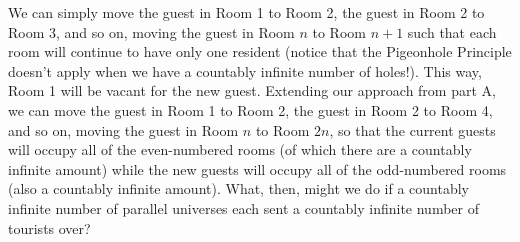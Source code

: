 \documentclass[solution, letterpaper]{cs20inclass}
\begin{document}
\begin{solution}
\subsolution We can simply move the guest in Room 1 to Room 2, the guest in Room 2 to Room 3, and so on, moving the guest in Room $n$ to Room $n+1$ such that each room will continue to have only one resident (notice that the Pigeonhole Principle doesn't apply when we have a countably infinite number of holes!). This way, Room 1 will be vacant for the new guest.
\subsolution Extending our approach from part A, we can move the guest in Room 1 to Room 2, the guest in Room 2 to Room 4, and so on, moving the guest in Room $n$ to Room $2n$, so that the current guests will occupy all of the even-numbered rooms (of which there are a countably infinite amount) while the new guests will occupy all of the odd-numbered rooms (also a countably infinite amount). What, then, might we do if a countably infinite number of parallel universes each sent a countably infinite number of tourists over?
\end{solution}
\end{document}
